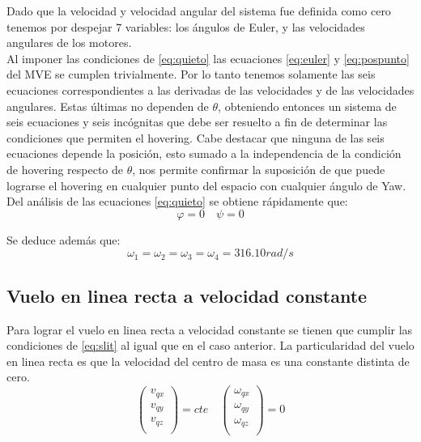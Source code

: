 \documentclass[main]{subfiles}
\begin{document}
Dado que la velocidad y velocidad angular del sistema fue definida como cero tenemos por despejar 7 variables: los \'angulos de Euler, y las velocidades angulares de los motores. \\

Al imponer las condiciones de \ref{eq:quieto} las ecuaciones \ref{eq:euler} y \ref{eq:pospunto} del MVE se cumplen trivialmente. Por lo tanto tenemos solamente las seis ecuaciones correspondientes a las derivadas de las velocidades y de las velocidades angulares. Estas \'ultimas  no dependen de $\theta$, obteniendo entonces un sistema de seis ecuaciones y seis inc\'ognitas que debe ser resuelto a fin de determinar las condiciones que permiten el hovering. Cabe destacar que ninguna de las seis ecuaciones depende la posici\'on, esto sumado a la independencia de la condici\'on de hovering respecto de $\theta$, nos permite confirmar la suposici\'on de que puede lograrse el hovering en cualquier punto del espacio con cualquier \'angulo de Yaw.\\

Del an\'alisis de las ecuaciones \ref{eq:quieto} se obtiene r\'apidamente que:
\begin{equation}
\varphi=0 \quad \psi=0
\end{equation}

Se deduce adem\'as que:
\begin{equation}
\omega_1=\omega_2=\omega_3=\omega_4=316.10 rad/s
\end{equation}

\subsection{Vuelo en linea recta a velocidad constante}

Para lograr el vuelo en linea recta a velocidad constante se tienen que cumplir las condiciones de \ref{eq:slit} al igual que en el caso anterior. La particularidad del vuelo en linea recta es que la velocidad del centro de masa es una constante distinta de cero. 
\begin{equation}
\label{eq:recta}
\left(\begin{array}{c}
v_{qx}\\
v_{qy}\\
v_{qz}\\
\end{array}\right)=cte \quad
\left(\begin{array}{c}
\omega_{qx}\\
\omega_{qy}\\
\omega_{qz}\\
\end{array}\right)=0
\end{equation}
\end{document}
